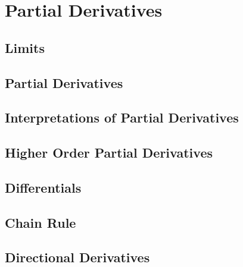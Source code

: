 \documentclass[../satmath.tex]{subfiles}
\begin{document}
\chapter{Partial Derivatives}
\section{Limits}
\section{Partial Derivatives}
\section{Interpretations of Partial Derivatives}
\section{Higher Order Partial Derivatives}
\section{Differentials}
\section{Chain Rule}
\section{Directional Derivatives}
\end{document}
